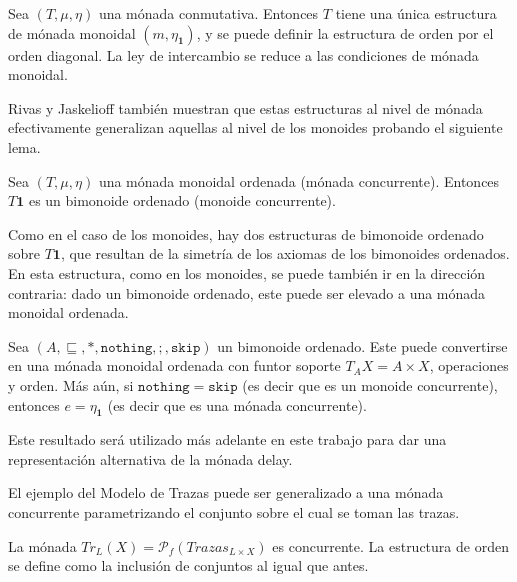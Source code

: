 \begin{ejemplo}
Sea $(\mathit{T},\mu,\eta)$ una mónada conmutativa. Entonces $\mathit{T}$ tiene una única estructura de mónada monoidal $(m,\eta_{\mathbf{1}})$, y se puede definir la estructura de orden por el orden diagonal. La ley de intercambio se reduce a las condiciones de mónada monoidal. 
\end{ejemplo}

Rivas y Jaskelioff \cite{rivas:2019} también muestran que estas estructuras al nivel de mónada efectivamente generalizan aquellas al nivel de los monoides probando el siguiente lema.

\begin{lema}
Sea $(\mathit{T},\mu,\eta)$ una mónada monoidal ordenada (mónada concurrente). Entonces $\mathit{T} \mathbf{1}$ es un bimonoide ordenado (monoide concurrente). 
\end{lema}

Como en el caso de los monoides, hay dos estructuras de bimonoide ordenado sobre $\mathit{T} \mathbf{1}$, que resultan de la simetría de los axiomas de los bimonoides ordenados.  En esta estructura, como en los monoides, se puede también ir en la dirección contraria: dado un bimonoide ordenado, este puede ser elevado a una mónada monoidal ordenada.

\begin{lema}
Sea $(A,\sqsubseteq,*,\mathtt{nothing},;,\mathtt{skip})$ un bimonoide ordenado. Este puede convertirse en una mónada monoidal ordenada con funtor soporte $\mathit{T}_A X = A \times X$, operaciones y orden. Más aún, si $\mathtt{nothing} = \mathtt{skip}$ (es decir que es un monoide concurrente), entonces $e = \eta_{\mathbf{1}}$ (es decir que es una mónada concurrente).
\end{lema}

Este resultado será utilizado más adelante en este trabajo para dar una representación alternativa de la mónada delay. 

El ejemplo del Modelo de Trazas puede ser generalizado a una mónada concurrente parametrizando el conjunto sobre el cual se toman las trazas. 

\begin{ejemplo}
La mónada $Tr_L(X) = \mathcal{P}_f(Trazas_{L \times X})$ es concurrente. La estructura de orden se define como la inclusión de conjuntos al igual que antes.
\end{ejemplo}
